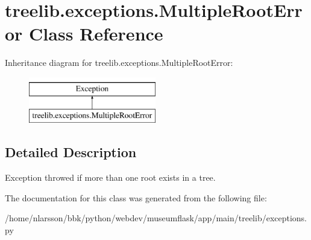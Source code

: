 \hypertarget{classtreelib_1_1exceptions_1_1MultipleRootError}{}\section{treelib.\+exceptions.\+Multiple\+Root\+Error Class Reference}
\label{classtreelib_1_1exceptions_1_1MultipleRootError}
Inheritance diagram for treelib.\+exceptions.\+Multiple\+Root\+Error\+:\begin{figure}[H]
\begin{center}
\leavevmode
\includegraphics[height=2.000000cm]{classtreelib_1_1exceptions_1_1MultipleRootError}
\end{center}
\end{figure}


\subsection{Detailed Description}
\begin{DoxyVerb}Exception throwed if more than one root exists in a tree.\end{DoxyVerb}
 

The documentation for this class was generated from the following file\+:\begin{DoxyCompactItemize}
\item 
/home/nlarsson/bbk/python/webdev/museumflask/app/main/treelib/exceptions.\+py\end{DoxyCompactItemize}
